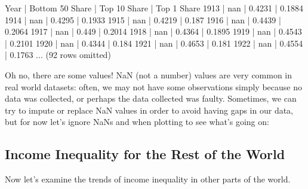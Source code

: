 \documentclass[letterpaper,10pt,english]{jupyterBook}
\begin{document}
\begin{sphinxVerbatim}[commandchars=\\\{\}]
Year | Bottom 50\PYGZpc{} Share | Top 10\PYGZpc{} Share | Top 1\PYGZpc{} Share
1913 | nan              | 0.4231        | 0.1884
1914 | nan              | 0.4295        | 0.1933
1915 | nan              | 0.4219        | 0.187
1916 | nan              | 0.4439        | 0.2064
1917 | nan              | 0.449         | 0.2014
1918 | nan              | 0.4364        | 0.1895
1919 | nan              | 0.4543        | 0.2101
1920 | nan              | 0.4344        | 0.184
1921 | nan              | 0.4653        | 0.181
1922 | nan              | 0.4554        | 0.1763
... (92 rows omitted)
\end{sphinxVerbatim}

\sphinxAtStartPar
Oh no, there are some  values! NaN (not a number) values are very common in real world datasets: often, we may not have some observations simply because no data was collected, or perhaps the data collected was faulty. Sometimes, we can try to impute or replace NaN values in order to avoid having gaps in our data, but for now let’s ignore NaNs and when plotting to see what’s going on:

\noindent{}


\subsection{Income Inequality for the Rest of the World}
\label{\detokenize{content/06-inequality/historical-inequality:income-inequality-for-the-rest-of-the-world}}
\sphinxAtStartPar
Now let’s examine the trends of income inequality in other parts of the world.
\end{document}

